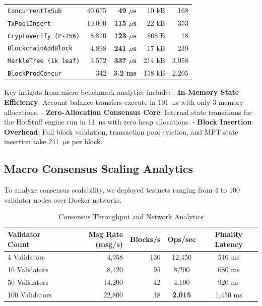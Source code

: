 \documentclass[10pt,journal,compsoc,twocolumn]{IEEEtran}
\begin{document}
\begin{table}[h]
\begin{tabular}{lrrrr}
\texttt{ConcurrentTxSub} & 40,675 & \textbf{49 $\mu$s} & 10 kB & 168 \\
\texttt{TxPoolInsert} & 10,000 & \textbf{115 $\mu$s} & 22 kB & 353 \\
\texttt{CryptoVerify (P-256)} & 8,870 & \textbf{123 $\mu$s} & 808 B & 18 \\
\texttt{BlockchainAddBlock} & 4,898 & \textbf{241 $\mu$s} & 17 kB & 239 \\
\texttt{MerkleTree (1k leaf)} & 3,572 & \textbf{337 $\mu$s} & 214 kB & 3,058 \\
\texttt{BlockProdConcur} & 342 & \textbf{3.2 ms} & 158 kB & 2,205 \\
\bottomrule
\end{tabular}
\end{table}

Key insights from micro-benchmark analytics include:
- \textbf{In-Memory State Efficiency}: Account balance transfers execute in 101~ns with only 3 memory allocations.
- \textbf{Zero-Allocation Consensus Core}: Internal state transitions for the HotStuff engine run in 11~ns with zero heap allocations.
- \textbf{Block Insertion Overhead}: Full block validation, transaction pool eviction, and MPT state insertion take 241~$\mu$s per block.

\subsection{Macro Consensus Scaling Analytics}
To analyze consensus scalability, we deployed testnets ranging from 4 to 100 validator nodes over Docker networks.

\begin{table}[h]
\caption{Consensus Throughput and Network Analytics}
\label{tab:macro_consensus}
\centering
\begin{tabular}{lrrcc}
\toprule
\textbf{Validator Count} & \textbf{Msg Rate (msg/s)} & \textbf{Blocks/s} & \textbf{Ops/sec} & \textbf{Finality Latency} \\
\midrule
4 Validators & 4,958 & 130 & 12,450 & 510 ms \\
16 Validators & 8,120 & 95 & 8,200 & 680 ms \\
50 Validators & 14,200 & 42 & 4,100 & 920 ms \\
100 Validators & 22,800 & 18 & \textbf{2,015} & 1,450 ms \\
\bottomrule
\end{tabular}
\end{table}
\end{document}
